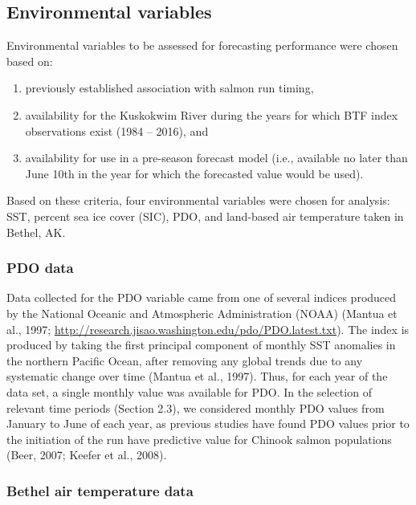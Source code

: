 \documentclass[12pt,]{book}
\providecommand{\tightlist}{%
  \setlength{\itemsep}{0pt}\setlength{\parskip}{0pt}}
\theoremstyle{definition}
\theoremstyle{definition}
\theoremstyle{definition}
\theoremstyle{remark}
\begin{document}
\subsection{Environmental variables}\label{environmental-variables}

Environmental variables to be assessed for forecasting performance were
chosen based on:

\begin{enumerate}
\def\labelenumi{\arabic{enumi}.}
\tightlist
\item
  previously established association with salmon run timing,
\item
  availability for the Kuskokwim River during the years for which BTF
  index observations exist (1984 -- 2016), and
\item
  availability for use in a pre-season forecast model (i.e., available
  no later than June 10th in the year for which the forecasted value
  would be used).
\end{enumerate}

Based on these criteria, four environmental variables were chosen for
analysis: SST, percent sea ice cover (SIC), PDO, and land-based air
temperature taken in Bethel, AK.

\subsubsection{PDO data}\label{pdo-data}

Data collected for the PDO variable came from one of several indices
produced by the National Oceanic and Atmospheric Administration (NOAA)
(Mantua et al., 1997;
\url{http://research.jisao.washington.edu/pdo/PDO.latest.txt}). The
index is produced by taking the first principal component of monthly SST
anomalies in the northern Pacific Ocean, after removing any global
trends due to any systematic change over time (Mantua et al., 1997).
Thus, for each year of the data set, a single monthly value was
available for PDO. In the selection of relevant time periods (Section
2.3), we considered monthly PDO values from January to June of each
year, as previous studies have found PDO values prior to the initiation
of the run have predictive value for Chinook salmon populations (Beer,
2007; Keefer et al., 2008).

\subsubsection{Bethel air temperature
data}\label{bethel-air-temperature-data}
\end{document}
